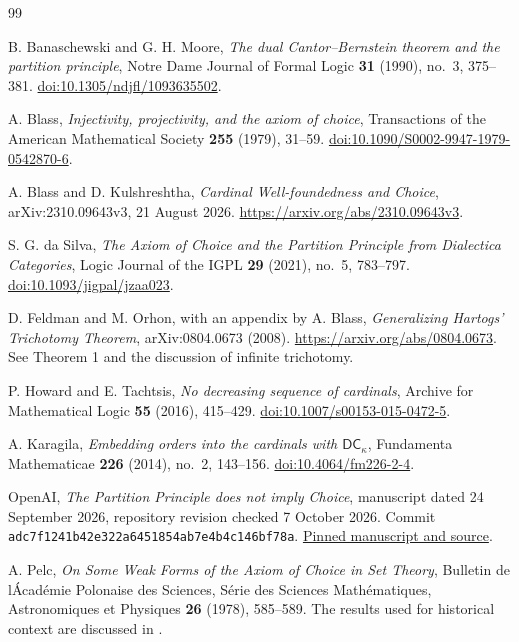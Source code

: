 \begin{thebibliography}{99}\small\raggedright
{} B. Banaschewski and G. H. Moore, \emph{The dual Cantor--Bernstein theorem and the partition principle}, Notre Dame Journal of Formal Logic \textbf{31} (1990), no.~3, 375--381. \href{https://doi.org/10.1305/ndjfl/1093635502}{doi:10.1305/ndjfl/1093635502}.

 A. Blass, \emph{Injectivity, projectivity, and the axiom of choice}, Transactions of the American Mathematical Society \textbf{255} (1979), 31--59. \href{https://doi.org/10.1090/S0002-9947-1979-0542870-6}{doi:10.1090/S0002-9947-1979-0542870-6}.

 A. Blass and D. Kulshreshtha, \emph{Cardinal Well-foundedness and Choice}, arXiv:2310.09643v3, 21 August 2026. \url{https://arxiv.org/abs/2310.09643v3}.

 S. G. da Silva, \emph{The Axiom of Choice and the Partition Principle from Dialectica Categories}, Logic Journal of the IGPL \textbf{29} (2021), no.~5, 783--797. \href{https://doi.org/10.1093/jigpal/jzaa023}{doi:10.1093/jigpal/jzaa023}.

 D. Feldman and M. Orhon, with an appendix by A. Blass, \emph{Generalizing Hartogs' Trichotomy Theorem}, arXiv:0804.0673 (2008). \url{https://arxiv.org/abs/0804.0673}. See Theorem 1 and the discussion of infinite trichotomy.

 P. Howard and E. Tachtsis, \emph{No decreasing sequence of cardinals}, Archive for Mathematical Logic \textbf{55} (2016), 415--429. \href{https://doi.org/10.1007/s00153-015-0472-5}{doi:10.1007/s00153-015-0472-5}.

 A. Karagila, \emph{Embedding orders into the cardinals with $\mathsf{DC}_\kappa$}, Fundamenta Mathematicae \textbf{226} (2014), no.~2, 143--156. \href{https://doi.org/10.4064/fm226-2-4}{doi:10.4064/fm226-2-4}.

 OpenAI, \emph{The Partition Principle does not imply Choice}, manuscript dated 24 September 2026, repository revision checked 7 October 2026. Commit \texttt{adc7f1241b42e322a6451854ab7e4b4c146bf78a}. \href{https://github.com/openai/math/tree/adc7f1241b42e322a6451854ab7e4b4c146bf78a/preprints/The-Partition-Principle-does-not-imply-Choice-September-24-2026}{Pinned manuscript and source}.

 A. Pelc, \emph{On Some Weak Forms of the Axiom of Choice in Set Theory}, Bulletin de l\'Acad\'emie Polonaise des Sciences, S\'erie des Sciences Math\'ematiques, Astronomiques et Physiques \textbf{26} (1978), 585--589. The results used for historical context are discussed in \cite[Section 10]{BK}.


\end{thebibliography}
